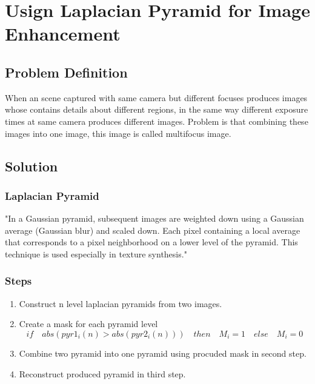 \documentclass[12pt]{article}
\begin{document}

\tableofcontents
\pagebreak


\section{Usign Laplacian Pyramid for Image Enhancement}
\subsection{Problem Definition}
When an scene captured with same camera but different focuses produces images whose contains details about different regions, in the same way different exposure times at same camera produces different images. Problem is that combining these images into one image, this image is called multifocus image.

\subsection{Solution}
\subsubsection{Laplacian Pyramid}

"In a Gaussian pyramid, subsequent images are weighted down using a Gaussian average (Gaussian blur) and scaled down. Each pixel containing a local average that corresponds to a pixel neighborhood on a lower level of the pyramid. This technique is used especially in texture synthesis." \cite{1}
\subsubsection{Steps}
\begin{enumerate}
\item Construct n level laplacian pyramids from two images.
\item{ Create a mask for each pyramid level
	\begin{equation*}
	  if\quad abs(pyr1_i(n) > abs(pyr2_i(n))) \quad then \quad M_i = 1 \quad else \quad M_i = 0
	\end{equation*}
     } 
\item Combine two pyramid into one pyramid using procuded mask in second step.
\item Reconstruct produced pyramid in third step.
\end{enumerate}
\end{document}
